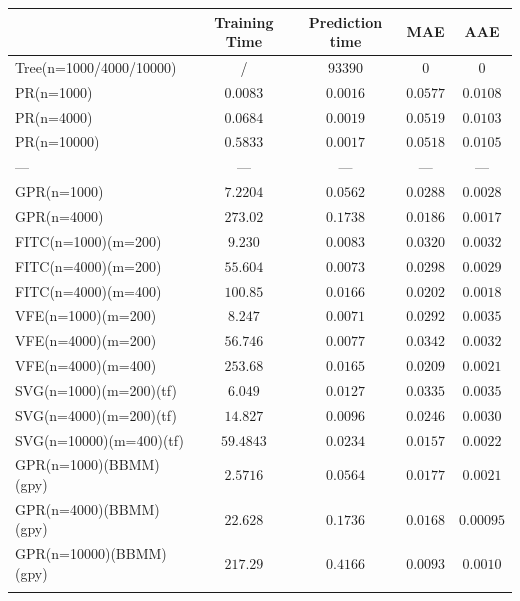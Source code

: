 \documentclass[12pt,a4paper,oneside]{book}
\begin{document}
\begin{table}\centering 
\begin{tabular}[t]{lcccc}\toprule
            &   Training Time  &  Prediction time &  MAE & AAE   \\ \midrule
Tree(n=1000/4000/10000)    &/ & $93 390$  &  $0$  & $0$     \\\addlinespace
PR(n=1000) & $0.0083$  & $0.0016$  & $0.0577$  &  $0.0108$        \\\addlinespace
PR(n=4000)    & $0.0684$  & $0.0019$  & $0.0519$  & $0.0103$      \\\addlinespace
PR(n=10000)	   & $0.5833$ & $0.0017$   & $0.0518$ & $0.0105$     \\\addlinespace
\qquad \qquad \qquad \qquad \qquad ---	  &   --- & --- & --- & ---     \\\addlinespace
GPR(n=1000) & $7.2204$  & $0.0562$  & $0.0288$  &  $0.0028$        \\\addlinespace
GPR(n=4000)   & $273.02$  & $0.1738$  & $0.0186$  & $0.0017$        \\\addlinespace
FITC(n=1000)(m=200)   & $9.230$  & $0.0083$  & $0.0320$  & $0.0032$    \\\addlinespace
FITC(n=4000)(m=200)    & $55.604$  & $0.0073$  & $0.0298$  & $0.0029$       \\\addlinespace
FITC(n=4000)(m=400)	  & $100.85$  & $0.0166$  & $0.0202$  & $0.0018$       \\\addlinespace
VFE(n=1000)(m=200)   & $8.247$  & $0.0071$  & $0.0292$  &  $0.0035$    \\\addlinespace
VFE(n=4000)(m=200)   & $56.746$  & $0.0077$  & $0.0342$  &  $0.0032$  \\\addlinespace
VFE(n=4000)(m=400)	  & $253.68$  & $0.0165$  & $0.0209$  & $0.0021$   \\\addlinespace
SVG(n=1000)(m=200)(tf)   & $6.049$  & $0.0127$  & $0.0335$  &  $0.0035$   \\\addlinespace
SVG(n=4000)(m=200)(tf)   & $14.827$  & $0.0096$  & $0.0246$  &  $0.0030$   \\\addlinespace
SVG(n=10000)(m=400)(tf)	  & $59.4843$  & $0.0234$  & $0.0157$  & $0.0022$    \\\addlinespace
GPR(n=1000)(BBMM)(gpy)   & $2.5716$  & $0.0564$  & $0.0177$  & $0.0021$    \\\addlinespace
GPR(n=4000)(BBMM)(gpy)   & $22.628$  & $0.1736$  & $0.0168$  &  $0.00095$   \\\addlinespace
GPR(n=10000)(BBMM)(gpy)   & $217.29$  & $0.4166$   & $0.0093$  &  $0.0010$   \\\addlinespace

\end{tabular}
\end{table}
\end{document}
